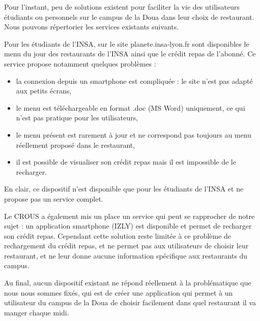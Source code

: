 Pour l’instant, peu de solutions existent pour faciliter la vie des 
utilisateurs étudiants ou personnels sur le campus de la Doua dans leur 
choix de restaurant. Nous pouvons répertorier les services existants suivants.

Pour les étudiants de l'INSA, sur le site planete.insa-lyon.fr sont disponibles 
le menu du jour des restaurants de l'INSA ainsi que le crédit repas de 
l'abonné. Ce service propose notamment quelques problèmes : 
\begin{itemize}
\item la connexion depuis un smartphone est compliquée : le site n'est pas 
adapté aux petits écrans,
\item le menu est téléchargeable en format .doc (MS Word) uniquement, ce qui 
n'est pas pratique pour les utilisateurs,
\item le menu présent est rarement à jour et ne correspond pas toujours au 
menu réellement proposé dans le restaurant,
\item il est possible de visualiser son crédit repas mais il est impossible 
de le recharger.
\end{itemize}

En clair, ce dispositif n'est disponible que pour les étudiants de l'INSA 
et ne propose pas un service complet.

Le CROUS a également mis un place un service qui peut se rapprocher de notre 
sujet : un application smartphone (IZLY) est disponible et permet de 
recharger son crédit repas. Cependant cette solution reste limitée à ce 
problème de rechargement du crédit repas, et ne permet pas aux utilisateurs 
de choisir leur restaurant, et ne leur donne aucune information spécifique 
aux restaurants du campus.

Au final, aucun dispositif existant ne répond réellement à la problématique 
que nous nous sommes fixés, qui est de créer une application qui permet à 
un utilisateur du campus de la Doua de choisir facilement dans quel restaurant 
il va manger chaque midi.
